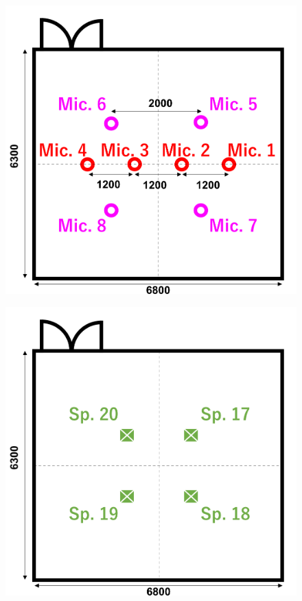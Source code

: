 \documentclass[11pt,a4j]{jreport}
\begin{document}
\begin{figure}[H]
  \begin{minipage}[b]{0.5\linewidth}
    \centering
    \includegraphics[width=.9\linewidth]{images/twoPiRoom/afcEquipArrayMic.png}
    \label{fig:マイクロホン配置}
  \end{minipage}%
  \begin{minipage}[b]{0.5\linewidth}
    \centering
    \includegraphics[width=.9\linewidth]{images/twoPiRoom/afcEquipArraySp3.png}
    \label{fig:スピーカー配置 三層目}
    \vfill
  \end{minipage}


\end{figure}
\end{document}
